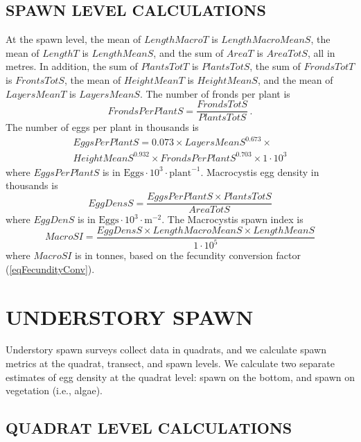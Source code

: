 \documentclass[12pt]{article}
\begin{document}
\subsection{SPAWN LEVEL CALCULATIONS}

At the spawn level, the mean of $LengthMacroT$ is $LengthMacroMeanS$, the mean of $LengthT$ is $LengthMeanS$, and the sum of $AreaT$ is $AreaTotS$, all in metres.
In addition, the sum of $PlantsTotT$ is $PlantsTotS$, the sum of $FrondsTotT$ is $FrontsTotS$, the mean of $HeightMeanT$ is $HeightMeanS$, and the mean of $LayersMeanT$ is $LayersMeanS$. 
The number of fronds per plant is
\begin{equation}
FrondsPerPlantS = \frac{FrondsTotS} {PlantsTotS} \, .
\label{eqFrondsPerPlant}
\end{equation}
The number of eggs per plant in thousands is \citep{HaegeleSchweigert1990}
\begin{multline}
EggsPerPlantS = 0.073 \times LayersMeanS^{0.673} \times \\ 
HeightMeanS^{0.932} \times FrondsPerPlantS^{0.703} \times 1 \cdot 10^{3}
\label{eqEggsPerPlantMacro}
\end{multline}
where $EggsPerPlantS$ is in $\text{Eggs} \cdot 10^{3} \cdot \text{plant}^{-1}$. 
Macrocystis egg density in thousands is
\begin{equation}
EggDensS = \frac{EggsPerPlantS \times PlantsTotS} {AreaTotS}
\label{eqEggDensityMacro}
\end{equation}
where $EggDenS$ is in $\text{Eggs} \cdot 10^{3} \cdot \text{m}^{-2}$.
The Macrocystis spawn index is
\begin{equation}
MacroSI = \frac{EggDensS \times LengthMacroMeanS \times LengthMeanS} {1 \cdot 10^{5}}
\label{eqBiomassMacro}
\end{equation}
where $MacroSI$ is in tonnes, based on the fecundity conversion factor (\autoref{eqFecundityConv}).

\section{UNDERSTORY SPAWN}\label{secUnder}

Understory spawn surveys collect data in quadrats, and we calculate spawn metrics at the quadrat, transect, and spawn levels.
We calculate two separate estimates of egg density at the quadrat level: spawn on the bottom, and spawn on vegetation (i.e., algae).

\subsection{QUADRAT LEVEL CALCULATIONS}
\end{document}
